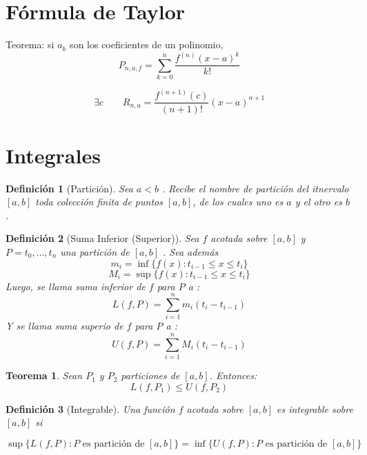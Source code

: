 \documentclass[12pt,a4paper]{extarticle}
\title{}
\newtheorem{theorem}{Teorema}[section]
\newtheorem{mydef}{Definici\'on}[section]
\begin{document}
\maketitle
\begin{center}\currfilename\end{center}

\section{F\'ormula de Taylor}

Teorema: si \(a_k\) son los coeficientes de un polinomio,
\[
P_{n, a, f} = \sum_{k=0}^n \frac{f^{(n)} (x-a)^k}{k!}
\]

\[
\exists c \qquad R_{n,a} =  \frac{f^{(n+1)}(c)}{(n+1)!}(x-a)^{n+1}
\]

\section{Integrales}


\begin{mydef}[Partici\'on]
Sea \( a < b \) . Recibe el nombre de \emph{partici\'on} del itnervalo
\( [a,b] \) toda colecci\'on finita de puntos \( [a,b] \), de los
cuales uno es \( a \) y el otro es \( b \) .
\end{mydef}

\begin{mydef}[Suma Inferior (Superior)]
Sea \( f \) acotada sobre \( [a,b] \) y \( P = {t_0, \dots, t_n} \)
una partici\'on de \( [a,b] \) . Sea adem\'as
\[ m_i= \inf\{f(x):t_{i-1} \leq x \leq t_i\} \]
\[ M_i= \sup\{f(x):t_{i-1} \leq x \leq t_i\} \]
Luego, se llama \emph{suma inferior} de \( f \)  para \( P \) a :
\[ L(f,P)= \sum_{i=1}^n m_i(t_i-t_{i-1}) \]
Y se llama \emph{suma superio} de \( f \)  para \( P \) a :
\[ U(f,P)= \sum_{i=1}^n M_i(t_i-t_{i-1}) \]
\end{mydef}

\begin{theorem}
Sean \( P_1 \) y \( P_2 \) particiones de \( [a,b] \). Entonces:
\[ L(f,P_1)\leq U(f,P_2) \]
\end{theorem}

\begin{mydef}[Integrable]
Una funci\'on \( f \) acotada sobre \( [a,b] \)  es \emph{integrable}
sobre \( [a,b] \) si

\[
\sup\{L(f,P): P \text{ es partici\'on de } [a,b] \} =
\inf\{U(f,P) : P \text{ es partici\'on de } [a,b] \}
\]
\end{mydef}
\end{document}
